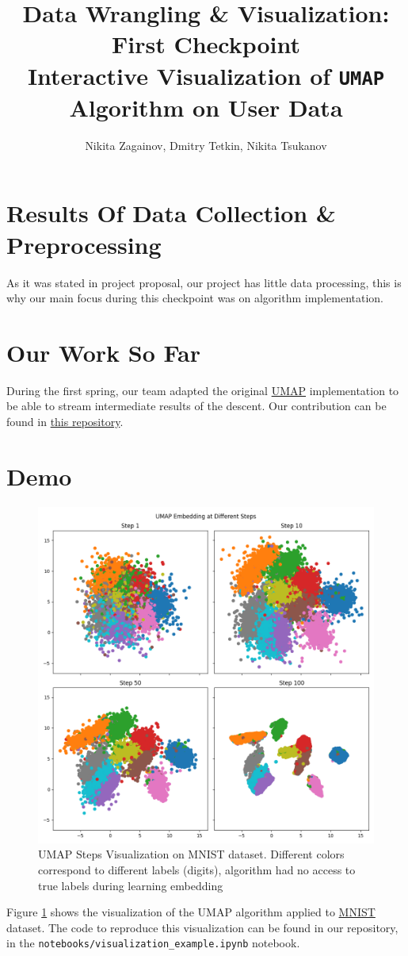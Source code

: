 \documentclass{article}
\title{Data Wrangling \& Visualization: First Checkpoint \\
 \textbf{Interactive Visualization of \texttt{UMAP} Algorithm on User Data}}
\author{Nikita Zagainov, Dmitry Tetkin, Nikita Tsukanov}
\date{\monthname[\the\month] \the\year}
\begin{document}
\maketitle

\section{Results Of Data Collection \& Preprocessing}

As it was stated in project proposal, our project 
has little data processing, this is why our main focus
during this checkpoint was on algorithm implementation.

\section{Our Work So Far}

During the first spring, our team adapted the original 
\href{https://arxiv.org/abs/1802.03426}{UMAP} implementation
to be able to stream intermediate results of the descent.
Our contribution can be found in  
\href{https://github.com/V1adych/umap}{this repository}.

\section{Demo}

\begin{figure}[ht]
	\centering
	\includegraphics[width=0.8\linewidth]{assets/umap_steps.png}
	\caption{UMAP Steps Visualization on MNIST dataset. 
	Different colors correspond 
	to different labels (digits), algorithm had no access to true 
	labels during learning embedding}
	\label{umap_steps}
\end{figure}

Figure \ref{umap_steps} shows the visualization of the 
UMAP algorithm applied to 
\href{https://yann.lecun.com/exdb/mnist/}{MNIST} dataset.
The code to reproduce this visualization can be found in
our repository, in the \verb|notebooks/visualization_example.ipynb| 
notebook.
\end{document}
